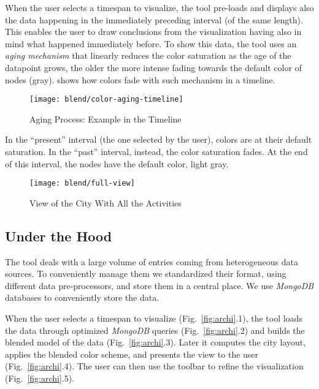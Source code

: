 When the user selects a timespan to visualize, the tool pre-loads and displays also the data happening in the immediately preceding interval (of the same length).
This enables the user to draw conclusions from the visualization having also in mind what happened immediately before.
To show this data, the tool uses an \emph{aging mechanism} that linearly reduces the color saturation as the age of the datapoint grows, \ie the older the more intense fading towards the default color of nodes (\ie gray).
 shows how colors fade with such mechanism in a timeline.

\begin{figure}[!ht]
\centering
\texttt{[image: blend/color-aging-timeline]}
\caption{Aging Process: Example in the Timeline}
\label{fig:color-aging-timeline}
\end{figure}


In the ``present'' interval (\ie the one selected by the user), colors are at their default saturation.
In the ``past''  interval, instead, the color saturation fades.
At the end of this interval, the nodes have the default color, \ie light gray.



\begin{figure*}[ht]
\centering
\texttt{[image: blend/full-view]}
\caption{View of the City With All the Activities}
\label{fig:full-view}
\end{figure*}



\subsection{Under the Hood}

The tool deals with a large volume of entries coming from heterogeneous data sources.
To conveniently manage them we standardized their format, using different data pre-processors, and store them in a central place.
We use \textit{MongoDB} databases to conveniently store the data.

When the user selects a timespan to visualize (Fig.~\ref{fig:archi}.1), the tool loads the data through optimized \textit{MongoDB} queries  (Fig.~\ref{fig:archi}.2) and builds the blended model of the data  (Fig.~\ref{fig:archi}.3).
Later it computes the city layout, applies the blended color scheme, and presents the view to the user (Fig.~\ref{fig:archi}.4).
The user can then use the toolbar to refine the visualization (Fig.~\ref{fig:archi}.5).

